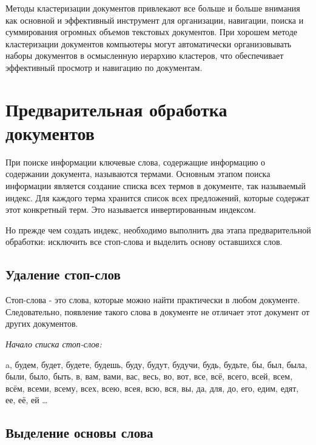 Методы кластеризации документов привлекают все больше и больше внимания
как основной и эффективный инструмент для организации, навигации, поиска и суммирования огромных объемов текстовых документов.
При хорошем методе кластеризации документов компьютеры могут автоматически организовывать наборы документов в осмысленную иерархию кластеров,
что обеспечивает эффективный просмотр и навигацию по документам.





\newpage





\section{Предварительная обработка документов}

При поиске информации ключевые слова,
содержащие информацию о содержании документа, называются термами.
Основным этапом поиска информации является создание списка всех термов в документе, так называемый индекс.
Для каждого терма хранится список всех предложений, которые содержат этот конкретный терм.
Это называется инвертированным индексом.

Но прежде чем создать индекс, необходимо выполнить два этапа предварительной обработки: исключить все стоп-слова и выделить основу оставшихся слов.



\subsection{Удаление стоп-слов}

Стоп-слова - это слова, которые можно найти практически в любом документе.
Следовательно, появление такого слова в документе не отличает этот документ от других документов.

\textit{Начало списка стоп-слов:}

a, будем, будет, будете, будешь, буду, будут, будучи, будь, будьте, бы,
был, была, были, было, быть, в, вам, вами, вас, весь, во, вот, все, всё,
всего, всей, всем, всём, всеми, всему, всех, всею, всея, всю, вся, вы,
да, для, до, его, едим, едят, ее, её, ей \ldots



\subsection{Выделение основы слова}

